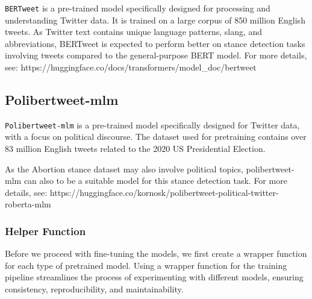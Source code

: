 \documentclass[11pt]{article}
\begin{document}
\texttt{BERTweet} is a pre-trained model specifically designed for
processing and understanding Twitter data. It is trained on a large
corpus of 850 million English tweets. As Twitter text contains unique
language patterns, slang, and abbreviations, BERTweet is expected to
perform better on stance detection tasks involving tweets compared to
the general-purpose BERT model. For more details, see:
https://huggingface.co/docs/transformers/model\_doc/bertweet

    \hypertarget{polibertweet-mlm}{%
\subsection{Polibertweet-mlm}\label{polibertweet-mlm}}

    \texttt{Polibertweet-mlm} is a pre-trained model specifically designed
for Twitter data, with a focus on political discourse. The dataset used
for pretraining contains over 83 million English tweets related to the
2020 US Presidential Election.

As the Abortion stance dataset may also involve political topics,
polibertweet-mlm can also to be a suitable model for this stance
detection task. For more details, see:
https://huggingface.co/kornosk/polibertweet-political-twitter-roberta-mlm

    \hypertarget{helper-function}{%
\subsubsection{Helper Function}\label{helper-function}}

    Before we proceed with fine-tuning the models, we first create a wrapper
function for each type of pretrained model. Using a wrapper function for
the training pipeline streamlines the process of experimenting with
different models, ensuring consistency, reproducibility, and
maintainability.
\end{document}
